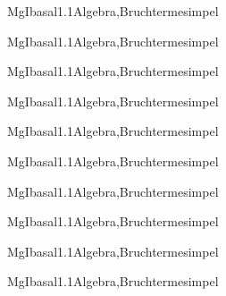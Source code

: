 \documentclass[12pt]{article}
\begin{document}
    \begin{Add}{MgI}{basal1.1}{Algebra,Bruchterme}{simpel}
    \solution{ }
    \end{Add}
    \begin{Add}{MgI}{basal1.1}{Algebra,Bruchterme}{simpel}
    \end{Add}
    

    \begin{Add}{MgI}{basal1.1}{Algebra,Bruchterme}{simpel}
    \solution{ }
    \end{Add}
    \begin{Add}{MgI}{basal1.1}{Algebra,Bruchterme}{simpel}
    \end{Add}
    

    \begin{Add}{MgI}{basal1.1}{Algebra,Bruchterme}{simpel}
    \solution{ }
    \end{Add}
    \begin{Add}{MgI}{basal1.1}{Algebra,Bruchterme}{simpel}
    \end{Add}
    

    \begin{Add}{MgI}{basal1.1}{Algebra,Bruchterme}{simpel}
    \solution{ }
    \end{Add}
    \begin{Add}{MgI}{basal1.1}{Algebra,Bruchterme}{simpel}
    \end{Add}
    

    \begin{Add}{MgI}{basal1.1}{Algebra,Bruchterme}{simpel}
    \solution{ }
    \end{Add}
    \begin{Add}{MgI}{basal1.1}{Algebra,Bruchterme}{simpel}
    \end{Add}
    
\end{document}
